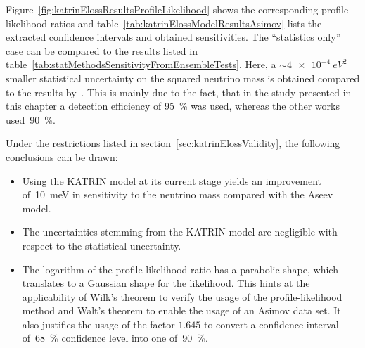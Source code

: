Figure~\ref{fig:katrinElossResultsProfileLikelihood} shows the corresponding profile-likelihood ratios and table~\ref{tab:katrinElossModelResultsAsimov} lists the extracted confidence intervals and obtained sensitivities. The ``statistics only'' case can be compared to the results listed in table~\ref{tab:statMethodsSensitivityFromEnsembleTests}. Here, a $\sim\SI{4e-4}{eV^2}$ smaller statistical uncertainty on the squared neutrino mass is obtained compared to the results by~\cite{Kleesiek2014, Hoetzel2012}. This is mainly due to the fact, that in the study presented in this chapter a detection efficiency of \SI{95}{\percent} was used, whereas the other works used~\SI{90}{\percent}.

Under the restrictions listed in section~\ref{sec:katrinElossValidity}, the following conclusions can be drawn:
\begin{itemize}
	\item Using the KATRIN model at its current stage yields an improvement of~\SI{10}{meV}  in sensitivity to the neutrino mass compared with the Aseev model.
	\item The uncertainties stemming from the KATRIN model are negligible with respect to the statistical uncertainty.
	\item The logarithm of the profile-likelihood ratio has a parabolic shape, which translates to a Gaussian shape for the likelihood. This hints at the applicability of  Wilk's theorem to verify the usage of the profile-likelihood method and Walt's theorem to enable the usage of an Asimov data set. It also justifies the usage of the factor $1.645$ to convert a confidence interval of~\SI{68}{\percent} confidence level into one of~\SI{90}{\percent}.
\end{itemize}

